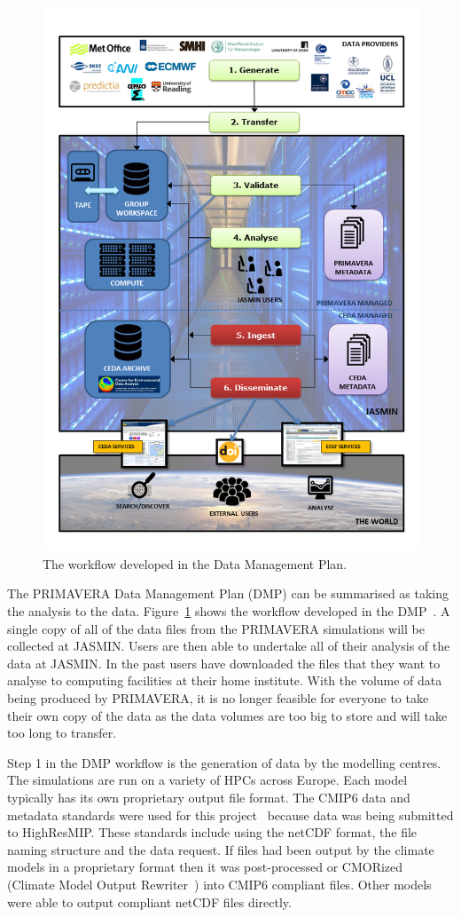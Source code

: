 \documentclass[gmd, manuscript]{copernicus}
\begin{document}
\begin{figure}[t]
\includegraphics[width=12cm]{fig01.png}
\caption{The workflow developed in the Data Management Plan.}
\label{dmp_workflow}
\end{figure}

The PRIMAVERA Data Management Plan (DMP) can be summarised as taking the analysis to the data. Figure~\ref{dmp_workflow} shows the workflow developed in the DMP~\citep{Mizielinski2016}. A single copy of all of the data files from the PRIMAVERA simulations will be collected at JASMIN. Users are then able to undertake all of their analysis of the data at JASMIN. In the past users have downloaded the files that they want to analyse to computing facilities at their home institute. With the volume of data being produced by PRIMAVERA, it is no longer feasible for everyone to take their own copy of the data as the data volumes are too big to store and will take too long to transfer.

Step 1 in the DMP workflow is the generation of data by the modelling centres. The simulations are run on a variety of HPCs across Europe. Each model typically has its own proprietary output file format. The CMIP6 data and metadata standards were used for this project~\citep{gmd-11-3659-2018} because data was being submitted to HighResMIP. These standards include using the netCDF format, the file naming structure and the data request. If files had been output by the climate models in a proprietary format then it was post-processed or CMORized (Climate Model Output Rewriter~\citep{Nadeau2019}) into CMIP6 compliant files. Other models were able to output compliant netCDF files directly.
\end{document}
